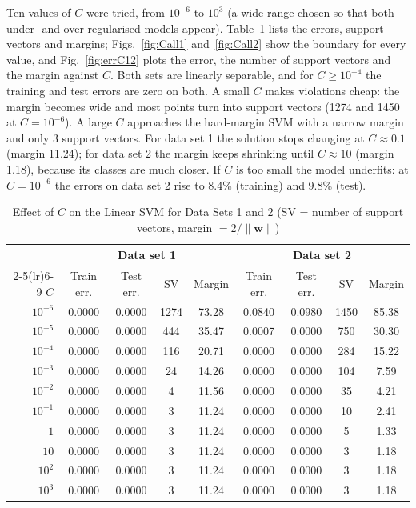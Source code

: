 \documentclass[conference,a4paper]{IEEEtran}
\begin{document}
Ten values of $C$ were tried, from $10^{-6}$ to $10^{3}$ (a wide range chosen so that both under- and over-regularised models appear).
Table~\ref{tab:C12} lists the errors, support vectors and margins; Figs.~\ref{fig:Call1} and~\ref{fig:Call2} show the boundary for every
value, and Fig.~\ref{fig:errC12} plots the error, the number of support vectors and the margin against $C$. Both sets are linearly separable, and for
$C\ge10^{-4}$ the training and test errors are zero on both. A small $C$ makes violations cheap: the margin becomes wide and
most points turn into support vectors (1274 and 1450 at $C=10^{-6}$). A large $C$ approaches the hard-margin SVM with a narrow margin
and only 3 support vectors. For data set 1 the solution stops changing at $C\approx0.1$ (margin 11.24); for data set 2 the margin
keeps shrinking until $C\approx10$ (margin 1.18), because its classes are much closer. If $C$ is too small the model underfits: at
$C=10^{-6}$ the errors on data set 2 rise to 8.4\% (training) and 9.8\% (test).

\begin{table}[!t]
\caption{Effect of $C$ on the Linear SVM for Data Sets 1 and 2 (SV = number of support vectors, margin $=2/\|\mathbf{w}\|$)}
\label{tab:C12}
\centering
\begin{tabular}{@{}r cccc cccc@{}}
\toprule
 & \multicolumn{4}{c}{Data set 1} & \multicolumn{4}{c}{Data set 2}\\
\cmidrule(lr){2-5}\cmidrule(lr){6-9}
$C$ & Train err. & Test err. & SV & Margin & Train err. & Test err. & SV & Margin\\
\midrule
$10^{-6}$ & 0.0000 & 0.0000 & 1274 & 73.28 & 0.0840 & 0.0980 & 1450 & 85.38\\
$10^{-5}$ & 0.0000 & 0.0000 & 444 & 35.47 & 0.0007 & 0.0000 & 750 & 30.30\\
$10^{-4}$ & 0.0000 & 0.0000 & 116 & 20.71 & 0.0000 & 0.0000 & 284 & 15.22\\
$10^{-3}$ & 0.0000 & 0.0000 & 24 & 14.26 & 0.0000 & 0.0000 & 104 & 7.59\\
$10^{-2}$ & 0.0000 & 0.0000 & 4 & 11.56 & 0.0000 & 0.0000 & 35 & 4.21\\
$10^{-1}$ & 0.0000 & 0.0000 & 3 & 11.24 & 0.0000 & 0.0000 & 10 & 2.41\\
$1$ & 0.0000 & 0.0000 & 3 & 11.24 & 0.0000 & 0.0000 & 5 & 1.33\\
$10$ & 0.0000 & 0.0000 & 3 & 11.24 & 0.0000 & 0.0000 & 3 & 1.18\\
$10^{2}$ & 0.0000 & 0.0000 & 3 & 11.24 & 0.0000 & 0.0000 & 3 & 1.18\\
$10^{3}$ & 0.0000 & 0.0000 & 3 & 11.24 & 0.0000 & 0.0000 & 3 & 1.18\\
\bottomrule
\end{tabular}
\end{table}
\end{document}
